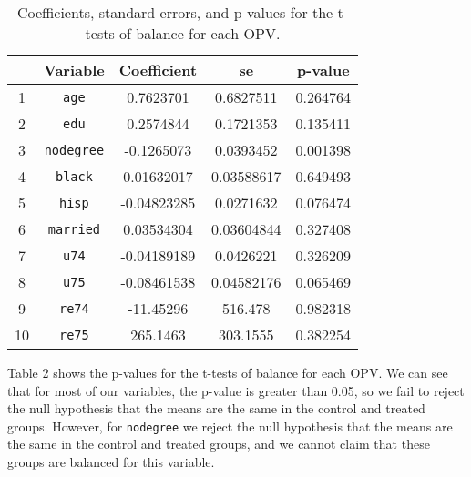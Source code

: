 \documentclass[
]{article}
\begin{document}
\begin{table}
\centering
\begin{tabular}{ccccc}
\hline
& \textbf{Variable} & \textbf{Coefficient} & \textbf{se} & \textbf{p-value} \\ \hline
1 & \texttt{age} & 0.7623701 & 0.6827511 & 0.264764 \\
2 & \texttt{edu} & 0.2574844 & 0.1721353 & 0.135411 \\
3 & \texttt{nodegree} & -0.1265073 & 0.0393452 & 0.001398 \\
4 & \texttt{black} & 0.01632017 & 0.03588617 & 0.649493 \\
5 & \texttt{hisp} & -0.04823285& 0.0271632 & 0.076474 \\
6 & \texttt{married} & 0.03534304 & 0.03604844 & 0.327408 \\
7 & \texttt{u74} & -0.04189189& 0.0426221 & 0.326209 \\
8 & \texttt{u75} & -0.08461538& 0.04582176 & 0.065469 \\
9 & \texttt{re74} & -11.45296 & 516.478 & 0.982318 \\
10 & \texttt{re75} & 265.1463 & 303.1555 & 0.382254 \\ \hline
\end{tabular}
\caption{Coefficients, standard errors, and p-values for the t-tests of balance for each OPV.}
\end{table}

Table 2 shows the p-values for the t-tests of balance for each OPV.
\newline  We can see that for most of our variables, the p-value is
greater than 0.05, so we fail to reject the null hypothesis that the
means are the same in the control and treated groups. However, for
\texttt{nodegree} we reject the null hypothesis that the means are the
same in the control and treated groups, and we cannot claim that these
groups are balanced for this variable.
\end{document}
